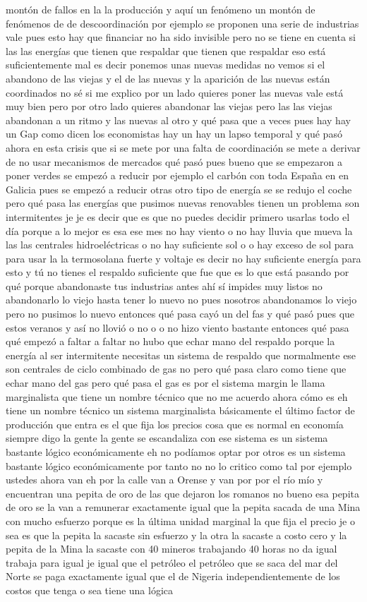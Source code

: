 montón de fallos en la la producción y aquí un fenómeno un montón de fenómenos de de descoordinación por ejemplo se proponen una serie de industrias vale pues esto hay que financiar no ha sido invisible pero no se tiene en cuenta si las las energías que tienen que respaldar que tienen que respaldar eso está suficientemente mal es decir ponemos unas nuevas medidas no vemos si el abandono de las viejas y el de las nuevas y la aparición de las nuevas están coordinados no sé si me explico por un lado quieres poner las nuevas vale está muy bien pero por otro lado quieres abandonar las viejas pero las las viejas abandonan a un ritmo y las nuevas al otro y qué pasa que a veces pues hay hay un Gap como dicen los economistas hay un hay un lapso temporal y qué pasó ahora en esta crisis que si se mete por una falta de coordinación se mete a derivar de no usar mecanismos de mercados qué pasó pues bueno que se empezaron a poner verdes se empezó a reducir por ejemplo el carbón con toda España en en Galicia pues se empezó a reducir otras otro tipo de energía se se redujo el coche pero qué pasa las energías que pusimos nuevas renovables tienen un problema son intermitentes je je es decir que es que no puedes decidir primero usarlas todo el día porque a lo mejor es esa ese mes no hay viento o no hay lluvia que mueva la las las centrales hidroeléctricas o no hay suficiente sol o o hay exceso de sol para para usar la la termosolana fuerte y voltaje es decir no hay suficiente energía para esto y tú no tienes el respaldo suficiente que fue que es lo que está pasando por qué porque abandonaste tus industrias antes ahí sí impides muy listos no abandonarlo lo viejo hasta tener lo nuevo no pues nosotros abandonamos lo viejo pero no pusimos lo nuevo entonces qué pasa cayó un del fas y qué pasó pues que estos veranos y así no llovió o no o o no hizo viento bastante entonces qué pasa qué empezó a faltar a faltar no hubo que echar mano del respaldo porque la energía al ser intermitente necesitas un sistema de respaldo que normalmente ese son centrales de ciclo combinado de gas no pero qué pasa claro como tiene que echar mano del gas pero qué pasa el gas es por el sistema margin le llama marginalista que tiene un nombre técnico que no me acuerdo ahora cómo es eh tiene un nombre técnico un sistema marginalista básicamente el último factor de producción que entra es el que fija los precios cosa que es normal en economía siempre digo la gente la gente se escandaliza con ese sistema es un sistema bastante lógico económicamente eh no podíamos optar por otros es un sistema bastante lógico económicamente por tanto no no lo critico como tal por ejemplo ustedes ahora van eh por la calle van a Orense y van por por el río mío y encuentran una pepita de oro de las que dejaron los romanos no bueno esa pepita de oro se la van a remunerar exactamente igual que la pepita sacada de una Mina con mucho esfuerzo porque es la última unidad marginal la que fija el precio je o sea es que la pepita la sacaste sin esfuerzo y la otra la sacaste a costo cero y la pepita de la Mina la sacaste con 40 mineros trabajando 40 horas no da igual trabaja para igual je igual que el petróleo el petróleo que se saca del mar del Norte se paga exactamente igual que el de Nigeria independientemente de los costos que tenga o sea tiene una lógica 